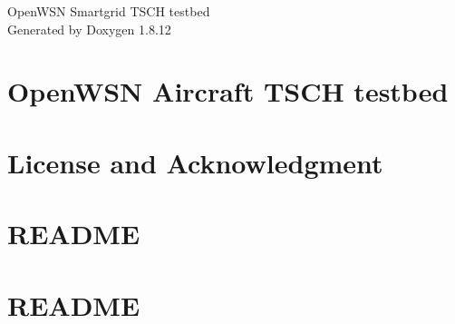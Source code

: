 \documentclass[twoside]{book}
\newcommand{\+}{\discretionary{\mbox{\scriptsize$\hookleftarrow$}}{}{}}
\newcommand{\clearemptydoublepage}{%
  \newpage{\pagestyle{empty}\cleardoublepage}%
}
\begin{document}
\hypersetup{pageanchor=false,
             bookmarksnumbered=true,
             pdfencoding=unicode
            }
\begin{titlepage}
\vspace*{7cm}
\begin{center}%
{\Large Open\+W\+SN Smartgrid T\+S\+CH testbed }\\
\vspace*{1cm}
{\large Generated by Doxygen 1.8.12}\\
\end{center}
\end{titlepage}
\clearemptydoublepage
{}
\tableofcontents
\clearemptydoublepage
{}
\hypersetup{pageanchor=true}

\chapter{Open\+W\+SN Aircraft T\+S\+CH testbed}
\label{index}\hypertarget{index}{}
\chapter{License and Acknowledgment}
\label{md__home_lkn_off_cloud__smartgrid-code__git_hub_openwsn-fw_bootloader_iot-lab__m3__r_e_a_d_m_e}
\hypertarget{md__home_lkn_off_cloud__smartgrid-code__git_hub_openwsn-fw_bootloader_iot-lab__m3__r_e_a_d_m_e}{}

\chapter{R\+E\+A\+D\+ME}
\label{md__home_lkn_off_cloud__smartgrid-code__git_hub_openwsn-fw_bootloader__open_mote-_c_c2538__r_e_a_d_m_e}
\hypertarget{md__home_lkn_off_cloud__smartgrid-code__git_hub_openwsn-fw_bootloader__open_mote-_c_c2538__r_e_a_d_m_e}{}

\chapter{R\+E\+A\+D\+ME}
\label{md__home_lkn_off_cloud__smartgrid-code__git_hub_openwsn-fw_bootloader__r_e_a_d_m_e}
\hypertarget{md__home_lkn_off_cloud__smartgrid-code__git_hub_openwsn-fw_bootloader__r_e_a_d_m_e}{}

\end{document}

